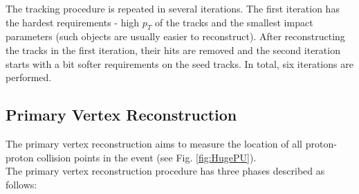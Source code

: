The tracking procedure is repeated in several iterations.
The first iteration has the hardest requirements - high $p_{T}$ of the tracks
and the smallest impact parameters (such objects are usually easier to reconstruct). After reconstructing the tracks in the first iteration,
their hits are removed and the second iteration starts with a bit softer requirements on the seed tracks. In total, six iterations are performed.
% 

\subsection{Primary Vertex Reconstruction}\label{ssec:vtxReco}

The primary vertex reconstruction aims to measure the location of all proton-proton collision points in the event (see Fig. \ref{fig:HugePU}). \\
The primary vertex reconstruction procedure has three phases described as follows\cite{Chatrchyan:2014fea}:

